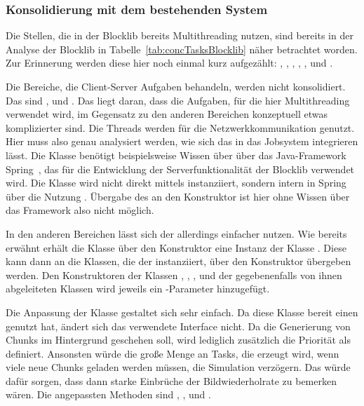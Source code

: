 \subsubsection{Konsolidierung mit dem bestehenden System}\label{sec:Konsolidierung}

Die Stellen, die in der Blocklib bereits Multithreading nutzen, sind bereits in der Analyse der Blocklib in Tabelle~\vref{tab:concTasksBlocklib} näher betrachtet worden. Zur Erinnerung werden diese hier noch einmal kurz aufgezählt: , , , , ,  und .

Die Bereiche, die Client-Server Aufgaben behandeln, werden nicht konsolidiert. Das sind ,  und . Das liegt daran, dass die Aufgaben, für die hier Multithreading verwendet wird, im Gegensatz zu den anderen Bereichen konzeptuell etwas komplizierter sind. Die Threads werden für die Netzwerkkommunikation genutzt. Hier muss also genau analysiert werden, wie sich das in das Jobsystem integrieren lässt. Die Klasse  benötigt beispielsweise Wissen über über das Java-Framework Spring~\cite{VMware2022}, das für die Entwicklung der Serverfunktionalität der Blocklib verwendet wird. Die Klasse wird nicht direkt mittels  instanziiert, sondern intern in Spring über die Nutzung . Übergabe des  an den Konstruktor ist hier ohne Wissen über das Framework also nicht möglich.

In den anderen Bereichen lässt sich der  allerdings einfacher nutzen. Wie bereits erwähnt erhält die Klasse  über den Konstruktor eine Instanz der Klasse . Diese kann dann an die Klassen, die der  instanziiert, über den Konstruktor übergeben werden. Den Konstruktoren der Klassen , , ,  und der gegebenenfalls von ihnen abgeleiteten Klassen wird jeweils ein -Parameter hinzugefügt.

Die Anpassung der Klasse  gestaltet sich sehr einfach. Da diese Klasse bereit einen  genutzt hat, ändert sich das verwendete Interface nicht. Da die Generierung von Chunks im Hintergrund geschehen soll, wird lediglich zusätzlich die Priorität als  definiert. Ansonsten würde die große Menge an Tasks, die erzeugt wird, wenn viele neue Chunks geladen werden müssen, die Simulation verzögern. Das würde dafür sorgen, dass dann starke Einbrüche der Bildwiederholrate zu bemerken wären. Die angepassten Methoden sind	, ,  und .

